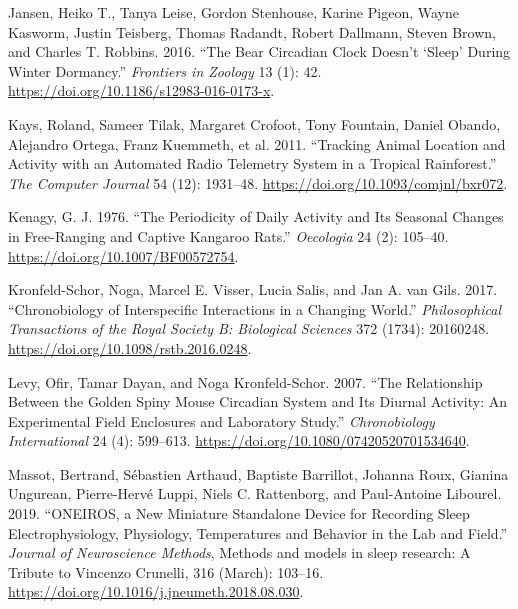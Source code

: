 \documentclass[msc,numbers,hidelinks]{coppe}
\newlength{\cslhangindent}
\newenvironment{cslreferences}%
  {\setlength{\parindent}{0pt}%
  \everypar{\setlength{\hangindent}{\cslhangindent}}\ignorespaces}%
  {\par}
\begin{document}
\begin{cslreferences}
  \leavevmode\hypertarget{ref-jansenBearCircadianClock2016}{}%
  Jansen, Heiko T., Tanya Leise, Gordon Stenhouse, Karine Pigeon, Wayne Kasworm, Justin Teisberg, Thomas Radandt, Robert Dallmann, Steven Brown, and Charles T. Robbins. 2016. ``The Bear Circadian Clock Doesn't `Sleep' During Winter Dormancy.'' \emph{Frontiers in Zoology} 13 (1): 42. \url{https://doi.org/10.1186/s12983-016-0173-x}.

  \leavevmode\hypertarget{ref-kaysTrackingAnimalLocation2011}{}%
  Kays, Roland, Sameer Tilak, Margaret Crofoot, Tony Fountain, Daniel Obando, Alejandro Ortega, Franz Kuemmeth, et al. 2011. ``Tracking Animal Location and Activity with an Automated Radio Telemetry System in a Tropical Rainforest.'' \emph{The Computer Journal} 54 (12): 1931--48. \url{https://doi.org/10.1093/comjnl/bxr072}.

  \leavevmode\hypertarget{ref-kenagyPeriodicityDailyActivity1976}{}%
  Kenagy, G. J. 1976. ``The Periodicity of Daily Activity and Its Seasonal Changes in Free-Ranging and Captive Kangaroo Rats.'' \emph{Oecologia} 24 (2): 105--40. \url{https://doi.org/10.1007/BF00572754}.

  \leavevmode\hypertarget{ref-kronfeld-schorChronobiologyInterspecificInteractions2017}{}%
  Kronfeld-Schor, Noga, Marcel E. Visser, Lucia Salis, and Jan A. van Gils. 2017. ``Chronobiology of Interspecific Interactions in a Changing World.'' \emph{Philosophical Transactions of the Royal Society B: Biological Sciences} 372 (1734): 20160248. \url{https://doi.org/10.1098/rstb.2016.0248}.

  \leavevmode\hypertarget{ref-levyRelationshipGoldenSpiny2007}{}%
  Levy, Ofir, Tamar Dayan, and Noga Kronfeld-Schor. 2007. ``The Relationship Between the Golden Spiny Mouse Circadian System and Its Diurnal Activity: An Experimental Field Enclosures and Laboratory Study.'' \emph{Chronobiology International} 24 (4): 599--613. \url{https://doi.org/10.1080/07420520701534640}.

  \leavevmode\hypertarget{ref-massotONEIROSNewMiniature2019}{}%
  Massot, Bertrand, Sébastien Arthaud, Baptiste Barrillot, Johanna Roux, Gianina Ungurean, Pierre-Hervé Luppi, Niels C. Rattenborg, and Paul-Antoine Libourel. 2019. ``ONEIROS, a New Miniature Standalone Device for Recording Sleep Electrophysiology, Physiology, Temperatures and Behavior in the Lab and Field.'' \emph{Journal of Neuroscience Methods}, Methods and models in sleep research: A Tribute to Vincenzo Crunelli, 316 (March): 103--16. \url{https://doi.org/10.1016/j.jneumeth.2018.08.030}.


\end{cslreferences}
\end{document}
